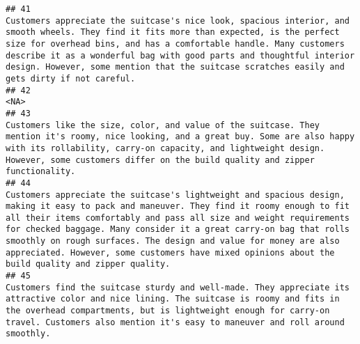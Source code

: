 \documentclass[
]{article}
\begin{document}
\begin{verbatim}
## 41                                                                                                                                                                                                                                      Customers appreciate the suitcase's nice look, spacious interior, and smooth wheels. They find it fits more than expected, is the perfect size for overhead bins, and has a comfortable handle. Many customers describe it as a wonderful bag with good parts and thoughtful interior design. However, some mention that the suitcase scratches easily and gets dirty if not careful.
## 42                                                                                                                                                                                                                                                                                                                                                                                                                                                                                                                                                                                                                       <NA>
## 43                                                                                                                                                                                                                                                                                                                                      Customers like the size, color, and value of the suitcase. They mention it's roomy, nice looking, and a great buy. Some are also happy with its rollability, carry-on capacity, and lightweight design. However, some customers differ on the build quality and zipper functionality.
## 44                                                                                                                                                            Customers appreciate the suitcase's lightweight and spacious design, making it easy to pack and maneuver. They find it roomy enough to fit all their items comfortably and pass all size and weight requirements for checked baggage. Many consider it a great carry-on bag that rolls smoothly on rough surfaces. The design and value for money are also appreciated. However, some customers have mixed opinions about the build quality and zipper quality.
## 45                                                                                                                                                                                                                                                                                                                                 Customers find the suitcase sturdy and well-made. They appreciate its attractive color and nice lining. The suitcase is roomy and fits in the overhead compartments, but is lightweight enough for carry-on travel. Customers also mention it's easy to maneuver and roll around smoothly.

\end{verbatim}
\end{document}
